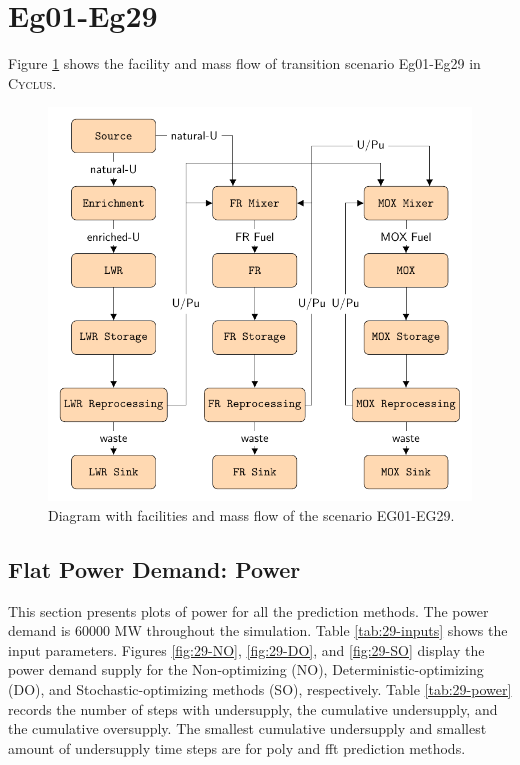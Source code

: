 \documentclass[11pt]{article}
\newcommand{\Cyclus}{\textsc{Cyclus}\xspace}%
\begin{document}
\section{Eg01-Eg29}

Figure \ref{fig:29flow} shows the facility and mass flow of transition scenario 
Eg01-Eg29 in \Cyclus.

\begin{figure}[H]
	\centering
	\includegraphics[width=\textwidth]{29-figures/29flow.pdf} 
	\hfill
	\caption{Diagram with facilities and mass flow of the scenario EG01-EG29.}
	\label{fig:29flow}
\end{figure}

\subsection{Flat Power Demand: Power}

This section presents plots of power for all the prediction methods. 
The power demand is 60000 MW throughout the simulation. 
Table \ref{tab:29-inputs} shows the input parameters. 
Figures \ref{fig:29-NO}, \ref{fig:29-DO}, and \ref{fig:29-SO} display 
the power demand supply for the Non-optimizing (NO), Deterministic-optimizing (DO), 
and Stochastic-optimizing methods (SO), respectively.
Table \ref{tab:29-power} records the number of steps with undersupply, 
the cumulative undersupply, and the cumulative oversupply. 
The smallest cumulative undersupply and smallest amount of undersupply 
time steps are for poly and fft prediction methods. 
\end{document}
